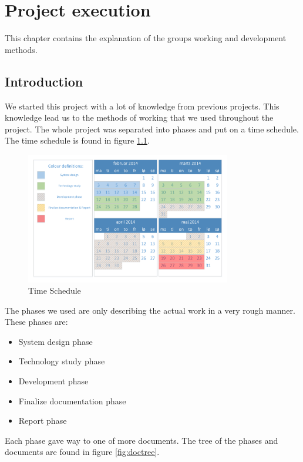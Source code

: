 \chapter{Project execution}
This chapter contains the explanation of the groups working and development methods.
\section{Introduction}
We started this project with a lot of knowledge from previous projects. This knowledge lead us to the methods of working that we used throughout the project. The whole project was separated into phases and put on a time schedule. The time schedule is found in figure \ref{fig:TimeSched}.
\begin{figure}[H]
\centering
\includegraphics[width=0.8\textwidth]{billeder/Timeschedule_neat}
\caption{Time Schedule}
\label{fig:TimeSched}
\end{figure}
The phases we used are only describing the actual work in a very rough manner. These phases are:
\begin{itemize}
\item System design phase
\item Technology study phase
\item Development phase
\item Finalize documentation phase
\item Report phase
\label{it:phases}
\end{itemize}
Each phase gave way to one of more documents. The tree of the phases and documents are found in figure \ref{fig:doctree}.
